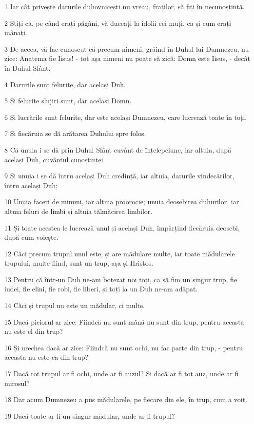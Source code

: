 \par 1 Iar cât privește darurile duhovnicești nu vreau, fraților, să fiți în necunoștință.
\par 2 Știți că, pe când erați păgâni, vă duceați la idolii cei muți, ca și cum erați mânați.
\par 3 De aceea, vă fac cunoscut că precum nimeni, grăind în Duhul lui Dumnezeu, nu zice: Anatema fie Iisus! - tot așa nimeni nu poate să zică: Domn este Iisus, - decât în Duhul Sfânt.
\par 4 Darurile sunt felurite, dar același Duh.
\par 5 Și felurite slujiri sunt, dar același Domn.
\par 6 Și lucrările sunt felurite, dar este același Dumnezeu, care lucrează toate în toți.
\par 7 Și fiecăruia se dă arătarea Duhului spre folos.
\par 8 Că unuia i se dă prin Duhul Sfânt cuvânt de înțelepciune, iar altuia, după același Duh, cuvântul cunoștinței.
\par 9 Și unuia i se dă întru același Duh credință, iar altuia, darurile vindecărilor, întru același Duh;
\par 10 Unuia faceri de minuni, iar altuia proorocie; unuia deosebirea duhurilor, iar altuia feluri de limbi și altuia tălmăcirea limbilor.
\par 11 Și toate acestea le lucrează unul și același Duh, împărțind fiecăruia deosebi, după cum voiește.
\par 12 Căci precum trupul unul este, și are mădulare multe, iar toate mădularele trupului, multe fiind, sunt un trup, așa și Hristos.
\par 13 Pentru că într-un Duh ne-am botezat noi toți, ca să fim un singur trup, fie iudei, fie elini, fie robi, fie liberi, și toți la un Duh ne-am adăpat.
\par 14 Căci și trupul nu este un mădular, ci multe.
\par 15 Dacă piciorul ar zice: Fiindcă nu sunt mână nu sunt din trup, pentru aceasta nu este el din trup?
\par 16 Și urechea dacă ar zice: Fiindcă nu sunt ochi, nu fac parte din trup, - pentru aceasta nu este ea din trup?
\par 17 Dacă tot trupul ar fi ochi, unde ar fi auzul? Și dacă ar fi tot auz, unde ar fi mirosul?
\par 18 Dar acum Dumnezeu a pus mădularele, pe fiecare din ele, în trup, cum a voit.
\par 19 Dacă toate ar fi un singur mădular, unde ar fi trupul?
